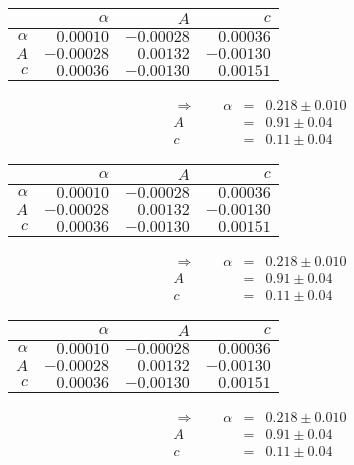  \begin{tabular}{|r|r|r|r|}
 \hline 
\cellcolor{tabcolor}&\cellcolor{tabcolor}$\alpha$&\cellcolor{tabcolor}$A$&\cellcolor{tabcolor}$c$\\ \hline 
 \cellcolor{tabcolor}$\alpha$&$0.00010$ &$-0.00028$ &$0.00036$ \\ \hline
\cellcolor{tabcolor}$A$&$-0.00028$ &$0.00132$ &$-0.00130$ \\ \hline
\cellcolor{tabcolor}$c$&$0.00036$ &$-0.00130$ &$0.00151$ \\ \hline
\end{tabular}
\begin{align}\Rightarrow \qquad
    \alpha &=& 0.218 \pm 0.010 \\
    A &=& 0.91 \pm 0.04 \\
    c &=& 0.11 \pm 0.04 
\end{align}

 \begin{tabular}{|r|r|r|r|}
 \hline 
\cellcolor{tabcolor}&\cellcolor{tabcolor}$\alpha$&\cellcolor{tabcolor}$A$&\cellcolor{tabcolor}$c$\\ \hline 
 \cellcolor{tabcolor}$\alpha$&$0.00010$ &$-0.00028$ &$0.00036$ \\ \hline
\cellcolor{tabcolor}$A$&$-0.00028$ &$0.00132$ &$-0.00130$ \\ \hline
\cellcolor{tabcolor}$c$&$0.00036$ &$-0.00130$ &$0.00151$ \\ \hline
\end{tabular}
\begin{align}\Rightarrow \qquad
    \alpha &=& 0.218 \pm 0.010 \\
    A &=& 0.91 \pm 0.04 \\
    c &=& 0.11 \pm 0.04 
\end{align}

 \begin{tabular}{|r|r|r|r|}
 \hline 
\cellcolor{tabcolor}&\cellcolor{tabcolor}$\alpha$&\cellcolor{tabcolor}$A$&\cellcolor{tabcolor}$c$\\ \hline 
 \cellcolor{tabcolor}$\alpha$&$0.00010$ &$-0.00028$ &$0.00036$ \\ \hline
\cellcolor{tabcolor}$A$&$-0.00028$ &$0.00132$ &$-0.00130$ \\ \hline
\cellcolor{tabcolor}$c$&$0.00036$ &$-0.00130$ &$0.00151$ \\ \hline
\end{tabular}
\begin{align}\Rightarrow \qquad
    \alpha &=& 0.218 \pm 0.010 \\
    A &=& 0.91 \pm 0.04 \\
    c &=& 0.11 \pm 0.04 
\end{align}

